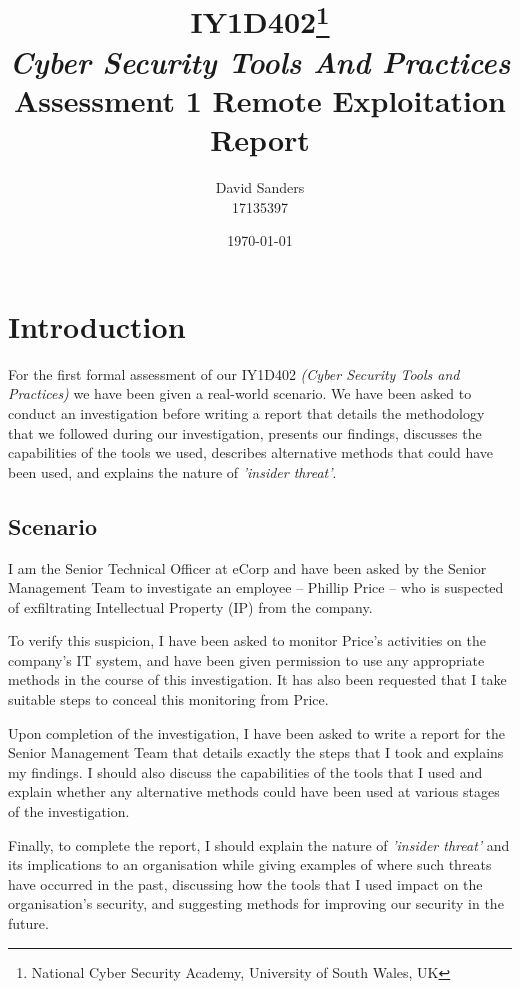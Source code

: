 \documentclass[12pt]{report}
\title{IY1D402\thanks{National Cyber Security Academy, University of South Wales, UK}\\{\textit{\small Cyber Security Tools And Practices}}\\Assessment 1 Remote Exploitation Report}
\author{David Sanders\\{\LARGE 17135397}}
\date{\today}
\begin{document}
\maketitle
\pagebreak
% 
\fontsize{11.5pt}{11.5pt}\selectfont
\tableofcontents
\fontsize{12pt}{12pt}\selectfont

\pagebreak
\chapter{Introduction}
For the first formal assessment of our IY1D402 \textit{(Cyber Security Tools and Practices)} we have been given a real-world scenario. We have been asked to conduct an investigation before writing a report that details the methodology that we followed during our investigation, presents our findings, discusses the capabilities of the tools we used, describes alternative methods that could have been used, and explains the nature of \textit{'insider threat'}.


\section{Scenario}
I am the Senior Technical Officer at eCorp and have been asked by the Senior Management Team to investigate an employee -- Phillip Price -- who is suspected of exfiltrating Intellectual Property (IP) from the company.

To verify this suspicion, I have been asked to monitor Price's activities on the company's IT system, and have been given permission to use any appropriate methods in the course of this investigation. It has also been requested that I take suitable steps to conceal this monitoring from Price.

Upon completion of the investigation, I have been asked to write a report for the Senior Management Team that details exactly the steps that I took and explains my findings. I should also discuss the capabilities of the tools that I used and explain whether any alternative methods could have been used at various stages of the investigation.

Finally, to complete the report, I should explain the nature of \textit{'insider threat'} and its implications to an organisation while giving examples of where such threats have occurred in the past, discussing how the tools that I used impact on the organisation's security, and suggesting methods for improving our security in the future.
\end{document}
